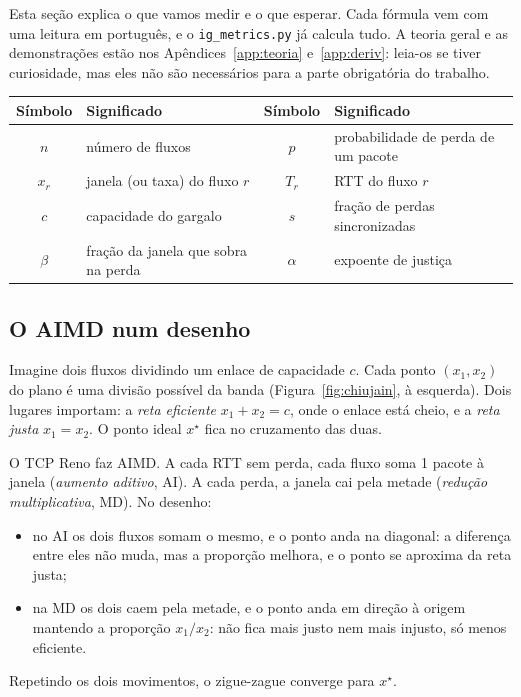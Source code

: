 \documentclass[11pt,a4paper]{article}
\begin{document}
Esta seção explica o que vamos medir e o que esperar. Cada fórmula vem com uma leitura
em português, e o \texttt{ig\_metrics.py} já calcula tudo. A teoria geral e as
demonstrações estão nos Apêndices~\ref{app:teoria} e~\ref{app:deriv}: leia-os se tiver
curiosidade, mas eles não são necessários para a parte obrigatória do trabalho.

\begin{center}
\small
\begin{tabular}{@{}cl@{\qquad}cl@{}}
\toprule
Símbolo & Significado & Símbolo & Significado\\
\midrule
$n$ & número de fluxos & $p$ & probabilidade de perda de um pacote\\
$x_r$ & janela (ou taxa) do fluxo $r$ & $T_r$ & RTT do fluxo $r$\\
$c$ & capacidade do gargalo & $s$ & fração de perdas sincronizadas\\
$\beta$ & fração da janela que sobra na perda & $\alpha$ & expoente de justiça\\
\bottomrule
\end{tabular}
\end{center}

\subsection{O AIMD num desenho}

Imagine dois fluxos dividindo um enlace de capacidade $c$. Cada ponto $(x_1,x_2)$ do
plano é uma divisão possível da banda (Figura~\ref{fig:chiujain}, à esquerda). Dois
lugares importam: a \emph{reta eficiente} $x_1+x_2=c$, onde o enlace está cheio, e a
\emph{reta justa} $x_1=x_2$. O ponto ideal $x^\star$ fica no cruzamento das duas.

O TCP Reno faz AIMD. A cada RTT sem perda, cada fluxo soma 1 pacote à janela
(\emph{aumento aditivo}, AI). A cada perda, a janela cai pela metade (\emph{redução
multiplicativa}, MD). No desenho:
\begin{itemize}
\item no AI os dois fluxos somam o mesmo, e o ponto anda na diagonal: a diferença entre
eles não muda, mas a proporção melhora, e o ponto se aproxima da reta justa;
\item na MD os dois caem pela metade, e o ponto anda em direção à origem mantendo a
proporção $x_1/x_2$: não fica mais justo nem mais injusto, só menos eficiente.
\end{itemize}
Repetindo os dois movimentos, o zigue-zague converge para $x^\star$.
\end{document}
